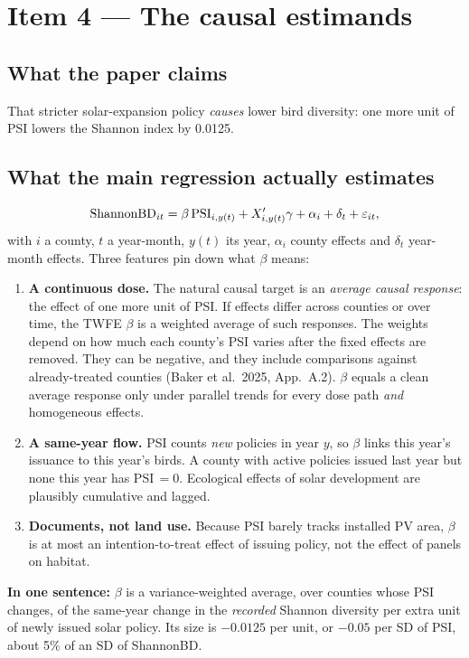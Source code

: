\documentclass[11pt]{article}
\begin{document}
\section{Item 4 --- The causal estimands}

\subsection{What the paper claims}
That stricter solar-expansion policy \emph{causes} lower bird diversity: one more unit of PSI lowers the Shannon index by 0.0125.

\subsection{What the main regression actually estimates}
\begin{equation}
\text{ShannonBD}_{it}=\beta\,\mathrm{PSI}_{i,y(t)}+X_{i,y(t)}'\gamma+\alpha_i+\delta_t+\varepsilon_{it},
\end{equation}
with $i$ a county, $t$ a year-month, $y(t)$ its year, $\alpha_i$ county effects and $\delta_t$ year-month effects. Three features pin down what $\beta$ means:
\begin{enumerate}
\item \textbf{A continuous dose.} The natural causal target is an \emph{average causal response}: the effect of one more unit of PSI. If effects differ across counties or over time, the TWFE $\beta$ is a weighted average of such responses. The weights depend on how much each county's PSI varies after the fixed effects are removed. They can be negative, and they include comparisons against already-treated counties (Baker et al.\ 2025, App.\ A.2). $\beta$ equals a clean average response only under parallel trends for every dose path \emph{and} homogeneous effects.
\item \textbf{A same-year flow.} PSI counts \emph{new} policies in year $y$, so $\beta$ links this year's issuance to this year's birds. A county with active policies issued last year but none this year has PSI\,$=0$. Ecological effects of solar development are plausibly cumulative and lagged.
\item \textbf{Documents, not land use.} Because PSI barely tracks installed PV area, $\beta$ is at most an intention-to-treat effect of issuing policy, not the effect of panels on habitat.
\end{enumerate}
\textbf{In one sentence:} $\beta$ is a variance-weighted average, over counties whose PSI changes, of the same-year change in the \emph{recorded} Shannon diversity per extra unit of newly issued solar policy. Its size is $-0.0125$ per unit, or $-0.05$ per SD of PSI, about 5\% of an SD of ShannonBD.
\end{document}

